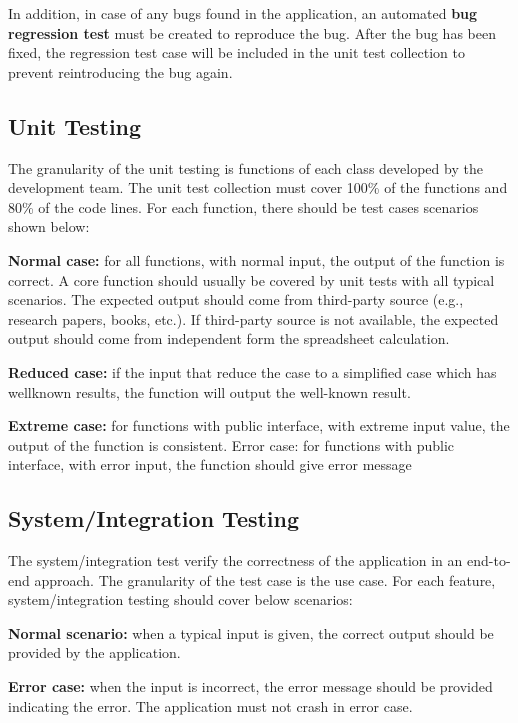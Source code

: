 In addition, in case of any bugs found in the application, an automated \textbf{bug regression test} must be created to reproduce the bug. After the bug has been fixed, the regression test case will be included in the unit test collection to prevent reintroducing the bug again.

\subsection{Unit Testing}

The granularity of the unit testing is functions of each class developed by the development team. The unit test collection must cover 100\% of the functions and 80\% of the
code lines. For each function, there should be test cases scenarios shown below:

\textbf{Normal case:} for all functions, with normal input, the output of the function is correct.
A core function should usually be covered by unit tests with all typical scenarios.
The expected output should come from third-party source (e.g., research papers, books,
etc.). If third-party source is not available, the expected output should come from
independent form the spreadsheet calculation.

\textbf{Reduced case:} if the input that reduce the case to a simplified case which has wellknown
results, the function will output the well-known result.

\textbf{Extreme case:} for functions with public interface, with extreme input value, the
output of the function is consistent. Error case: for functions with public interface,
with error input, the function should give error message

\subsection{System/Integration Testing}

The system/integration test verify the correctness of the application in an end-to-end approach. The granularity of the test case is the use case. For each feature, system/integration testing should cover below scenarios:

\textbf{Normal scenario:} when a typical input is given, the correct output should be provided
by the application.

\textbf{Error case:} when the input is incorrect, the error message should be provided indicating
the error. The application must not crash in error case.

